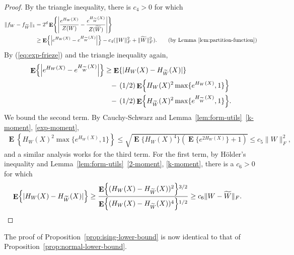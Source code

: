 \documentclass[letterpaper]{amsart}
\DeclarePairedDelimiter{\norm}{\lVert}{\rVert}
\DeclareMathOperator{\E}{\mathbf{E}}
\let\originalleft\left
\let\originalright\right
\def\left#1{\mathopen{}\originalleft#1}
\def\right#1{\originalright#1\mathclose{}}
\renewcommand{\eqref}[1]{(\ref{eq:#1})}
\numberwithin{thm}{section}
\newcommand{\lemref}[1]{Lemma~\ref{lem:#1}}
\newcommand{\propref}[1]{Proposition~\ref{prop:#1}}
\theoremstyle{definition}
\theoremstyle{plain}
\renewcommand{\tilde}[1]{\widetilde{#1}}
\begin{document}
\begin{proof}
  By the triangle inequality, there is $c_4 > 0$
  for which
  \begin{align}
    \norm{f_W - f_{\tilde{W}}}_1 &= 2^d \E\left\{ \left| \frac{e^{H_W(X)}}{Z(W)} - \frac{e^{H_{\tilde{W}}(X)}}{Z(\tilde{W})} \right| \right\} \notag \\
                              &\ge \E \left\{ \left| e^{H_W(X)} - e^{H_{\tilde{W}}(X)} \right| \right\} -  c_4 (\|W\|_F^2 + \|\tilde{W}\|_F^2) . \tag{by \lemref{partition-function}} 
  \end{align}
  By \eqref{exp-frieze} and the triangle inequality again,
  \begin{align*}
    \E\left\{\left|e^{H_W(X)} - e^{H_{\tilde{W}}(X)}\right|\right\} &\ge \E\{|H_W(X) - H_{\tilde{W}}(X)|\} \\
                                                                    &\hphantom{\ge} -\, (1/2) \E\left\{H_W(X)^2 \max\{e^{H_W(X)}, 1\}\right\} \\
                                                                    &\hphantom{\ge} -\, (1/2) \E\left\{H_{\tilde{W}}(X)^2 \max\{e^{H_{\tilde{W}}(X)}, 1\}\right\} .
  \end{align*}
  We bound the second term. By Cauchy-Schwarz and
  \lemref{form-utils}~\ref{k-moment}, \ref{exp-moment},
  \begin{align*}
    \E\left\{H_W(X)^2 \max\{e^{H_W(X)}, 1\}\right\} \le \sqrt{\E\{H_W(X)^4\} (\E\{e^{2H_W(X)}\} + 1)} \le c_5 \|W\|_F^2,
  \end{align*}
  and a similar analysis works for the third term. For the first term,
  by H\"{o}lder's inequality and \lemref{form-utils}~\ref{2-moment},
  \ref{k-moment}, there is a $c_6 > 0$ for which
  \begin{align*}
    \E\left\{|H_W(X) - H_{\tilde{W}}(X)| \right\} &\ge \frac{\E\left\{(H_W(X) - H_{\tilde{W}}(X))^2\right\}^{3/2}}{\E\left\{(H_W(X) - H_{\tilde{W}}(X))^4\right\}^{1/2}} \ge c_6 \|W - \tilde{W}\|_F . \qedhere
  \end{align*}
\end{proof}

The proof of \propref{ising-lower-bound} is now identical to that of
\propref{normal-lower-bound}.
\end{document}
